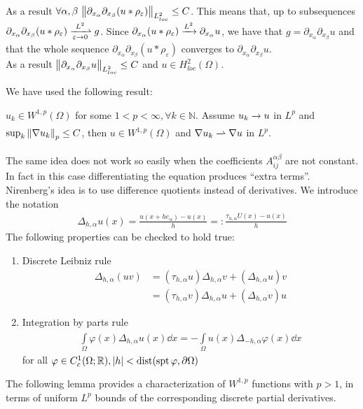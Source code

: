 As a result \( \forall \alpha ,\beta \, \left\lVert\partial_{x_{\alpha }}\partial_{x_{\beta}}(u\ast \rho _{\varepsilon })\right\rVert_{L_{loc}^{2}} \leq  C \). This means that, up to subsequences \( \partial_{x_{\alpha }}\partial_{x_{\beta}}(u\ast \rho _{\varepsilon }) \myxrightharpoonup[\varepsilon  \to 0]{L^{2}} g\). Since \( \partial_{x_{\alpha }}(u\ast \rho _{\varepsilon }) \myxrightarrow[]{L^{2}} \partial_{x_{\alpha }} u \), we have that \( g = \partial_{x_{\alpha }}\partial_{x_{\beta}}u\) and that the whole sequence \( \partial_{x_{\alpha }}\partial_{x_{\beta}}(u\ast \rho _{\varepsilon }) \) converges to \( \partial_{x_{\alpha }}\partial_{x_{\beta}}u \). \\
As a result \( \left\lVert\partial_{x_{\alpha }}\partial_{x_{\beta}}u\right\rVert_{L_{loc}^{2}} \leq  C \) and \( u \in H_{loc}^{2} (\Omega )  \).\\
\par

We have used the following result:
\begin{lem}
	\( u_{k}\in W^{1,p}(\Omega )\) for some \( 1 < p < \infty, \forall k \in  \mathbb{N} \). Assume \( u_{k} \myxrightarrow[]{} u  \) in \( L^{p} \) and \( \sup_{k}\left\lVert\nabla u_{k}\right\rVert_{p}\leq C \), then \( u\in W^{1,p}(\Omega ) \) and \( \nabla u_{k} \myxrightharpoonup[]{} \nabla u \) in \( L^{p} \).
\end{lem}
The same idea does not work so easily when the coefficients \( A_{ij}^{\alpha \beta } \) are not constant. In fact in this case differentiating the equation produces \enquote{extra terms}.\\
Nirenberg's idea is to use difference quotients instead of derivatives. We introduce the notation
\begin{gather}
	\Delta _{h, \alpha }u(x) = \frac{u(x+he_{\alpha})-u(x)}{h} =: \frac{\tau _{h, \alpha }U(x)-u(x) }{h }
\end{gather}
The following properties can be checked to hold true:
\begin{enumerate}[label= \( \bullet \)  ]
	\item Discrete Leibniz rule
	      \begin{align}
		      \Delta _{h, \alpha }(uv)
		       & = (\tau _{h, \alpha } u) \Delta _{h,\alpha }v + (\Delta _{h, \alpha} u) v    \\
		       & =    (\tau _{h, \alpha } v) \Delta _{h,\alpha }u + (\Delta _{h, \alpha} v) u
	      \end{align}

	\item Integration by parts rule
	      \begin{gather}
		      \int\limits_{\Omega}^{} \varphi (x) \Delta _{h, \alpha } u(x)   \dd{x} = -\int\limits_{\Omega}^{} u(x) \Delta _{-h, \alpha }\varphi (x)    \dd{x}
	      \end{gather}
	      for all \( \varphi \in  C_{c}^{1} (\Omega ; \mathbb{R}), \left\lvert h\right\rvert< \operatorname{dist}(\operatorname{spt} \varphi, \partial \Omega )  \)
\end{enumerate}
The following lemma provides a characterization of \( W^{1,p} \) functions with \( p>1 \), in terms of uniform \( L^{p} \) bounds of the corresponding discrete partial derivatives.

